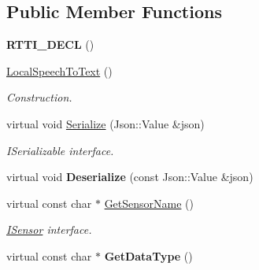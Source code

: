 \subsection*{Public Member Functions}
\begin{DoxyCompactItemize}
\item 
\mbox{\label{class_local_speech_to_text_a002252051030cae256a3173592caef21}} 
{\bfseries R\+T\+T\+I\+\_\+\+D\+E\+CL} ()
\item 
\mbox{\label{class_local_speech_to_text_a408e62a78bc6b0361f122f9281e27174}} 
\hyperlink{class_local_speech_to_text_a408e62a78bc6b0361f122f9281e27174}{Local\+Speech\+To\+Text} ()
\begin{DoxyCompactList}\small\item\em Construction. \end{DoxyCompactList}\item 
\mbox{\label{class_local_speech_to_text_a897619731ae0e4180cfe1bd09e5ee838}} 
virtual void \hyperlink{class_local_speech_to_text_a897619731ae0e4180cfe1bd09e5ee838}{Serialize} (Json\+::\+Value \&json)
\begin{DoxyCompactList}\small\item\em I\+Serializable interface. \end{DoxyCompactList}\item 
\mbox{\label{class_local_speech_to_text_a740a6fc38ca2b2031110570aa8c332e4}} 
virtual void {\bfseries Deserialize} (const Json\+::\+Value \&json)
\item 
\mbox{\label{class_local_speech_to_text_a9e324aa59ff87989fea2278bdb6a06cf}} 
virtual const char $\ast$ \hyperlink{class_local_speech_to_text_a9e324aa59ff87989fea2278bdb6a06cf}{Get\+Sensor\+Name} ()
\begin{DoxyCompactList}\small\item\em \hyperlink{class_i_sensor}{I\+Sensor} interface. \end{DoxyCompactList}\item 
\mbox{\label{class_local_speech_to_text_a7b9bcc2db6afe0223a7b16df0583946c}} 
virtual const char $\ast$ {\bfseries Get\+Data\+Type} ()
\item 

\end{DoxyCompactItemize}
